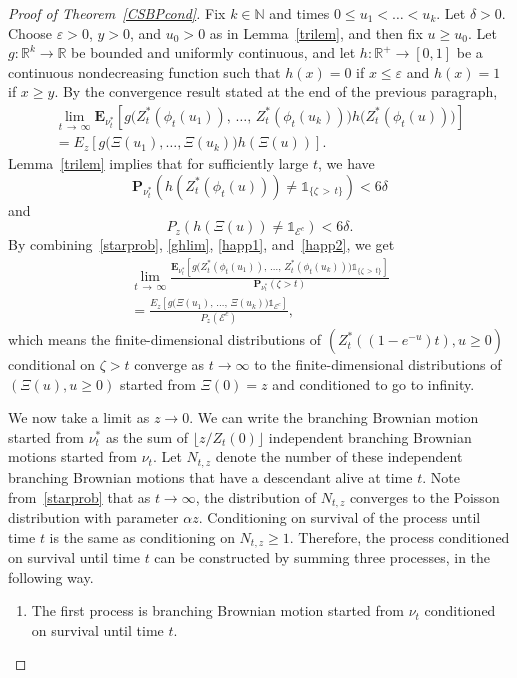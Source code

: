 \documentclass[AHL,Unicode,longabstracts,published]{cedram}
\newcommand*\eps{\varepsilon}
\newcommand*\E{\mathbf{E}}
\renewcommand*\P{\mathbf{P}}
\newcommand{\clE}{\mathcal{E}}
\newcommand*\N{\mathbb{N}}
\newcommand*\R{\mathbb{R}}
\newcommand{\1} {\mathds{1}}
\begin{document}
\begin{proof}[Proof of Theorem~\ref{CSBPcond}]
Fix $k \in \N$ and times $0 \leq u_1 < \dots < u_k$. Let $\delta > 0$. Choose $\eps > 0$, $y > 0$, and $u_0 > 0$ as in Lemma~\ref{trilem}, and then fix $u \geq u_0$. Let $g: \R^k \rightarrow \R$ be bounded and uniformly continuous, and let $h: \R^+ \rightarrow [0,1]$ be a continuous nondecreasing function such that $h(x) = 0$ if $x \leq \eps$ and $h(x) = 1$ if $x \geq y$. By the convergence result stated at the end of the previous paragraph,
\begin{multline}\label{ghlim}
\lim_{t\,\rightarrow\,\infty} \E_{\nu_t^*}\left[g\big(Z_t^*\left(\phi_t(u_1)\right),\,\dots,\, Z_t^*\left(\phi_t(u_k)\right)\big)h\big(Z_t^*\left(\phi_t(u)\right)\big)\right] \\
= E_z\left[g\big(\Xi(u_1), \dots, \Xi(u_k)\big) h(\Xi(u))\right].
\end{multline}
Lemma~\ref{trilem} implies that for sufficiently large $t$, we have
\begin{equation}\label{happ1}
\P_{\nu_t^*}\left(h\left(Z_t^*\left(\phi_t(u)\right)\right) \neq \1_{\{\zeta\,>\,t\}}\right) < 6 \delta
\end{equation}
and
\begin{equation}\label{happ2}
P_z\left(h(\Xi(u)) \neq \1_{\clE^c}\right) < 6 \delta.
\end{equation}
By combining~\eqref{starprob}, \eqref{ghlim}, \eqref{happ1}, and~\eqref{happ2}, we get
\begin{multline}\label{condlim}
\lim_{t\,\rightarrow\,\infty} \frac{\E_{\nu_t^*}\left[g\big(Z_t^*\left(\phi_t(u_1)\right),\, \dots,\, Z_t^*\left(\phi_t(u_k)\right)\big) \1_{\{\zeta\,>\,t\}}\right]}{\P_{\nu_t^*}(\zeta > t)} \\
= \frac{E_{z}\left[g\big(\Xi(u_1),\, \dots,\, \Xi(u_k)\big) \1_{\clE^c}\right]}{P_{z}\left(\clE^c\right)},
\end{multline}
which means the finite-dimensional distributions of $(Z_t^*((1 - e^{-u})t), u \geq 0)$ conditional on $\zeta > t$ converge as $t \rightarrow \infty$ to the finite-dimensional distributions of $(\Xi(u), u \geq 0)$ started from $\Xi(0) = z$ and conditioned to go to infinity.

We now take a limit as $z \rightarrow 0$. We can write the branching Brownian motion started from $\nu_t^*$ as the sum of $\lfloor z/Z_t(0) \rfloor$ independent branching Brownian motions started from $\nu_t$. Let $N_{t,z}$ denote the number of these independent branching Brownian motions that have a descendant alive at time $t$. Note from~\eqref{starprob} that as $t \rightarrow \infty$, the distribution of $N_{t,z}$ converges to the Poisson distribution with parameter $\alpha z$. Conditioning on survival of the process until time $t$ is the same as conditioning on $N_{t,z} \geq 1$. Therefore, the process conditioned on survival until time $t$ can be constructed by summing three processes, in the following way.
\begin{enumerate}
\item The first process is branching Brownian motion started from $\nu_t$ conditioned on survival until time $t$.


\end{enumerate}
\end{proof}
\end{document}
